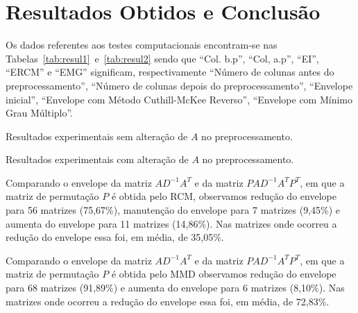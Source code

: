 \section{Resultados Obtidos e Conclusão}
Os dados referentes aos testes computacionais encontram-se nas
Tabelas~\ref{tab:resul1}~e~\ref{tab:resul2} sendo que ``Col. b.p'', ``Col,
a.p'', ``EI'', ``ERCM'' e ``EMG'' significam, respectivamente ``Número de
colunas antes do preprocessamento'', ``Número de colunas depois do preprocessamento'',
``Envelope inicial'', ``Envelope com Método Cuthill-McKee Reverso'', ``Envelope
com Mínimo Grau Múltiplo''.
\begin{table}[h]
    \centering
    \caption{Resultados experimentais sem alteração de $A$ no preprocessamento.}
    \label{tab:resul1}
\end{table}
\begin{sidewaystable}
  \caption{Resultados experimentais com alteração de $A$ no preprocessamento.}
  \label{tab:resul2}
  \hfill\vspace{-11pt}
\end{sidewaystable}

Comparando o envelope da matriz $A D^{-1} A^T$ e da matriz $P A D^{-1} A^T P^T$,
em que a matriz de permutação $P$ é obtida pelo RCM, observamos
redução do envelope para 56 matrizes (75,67\%),
manutenção do envelope para 7 matrizes (9,45\%) e
aumenta do envelope para 11 matrizes (14,86\%).
Nas matrizes onde ocorreu a redução do envelope essa foi, em média, de 35,05\%.

Comparando o envelope da matriz $A D^{-1} A^T$ e da matriz $P A D^{-1} A^T P^T$,
em que a matriz de permutação $P$ é obtida pelo MMD
observamos
redução do envelope para 68 matrizes (91,89\%) e
aumenta do envelope para 6 matrizes (8,10\%).
Nas matrizes onde ocorreu a redução do envelope essa foi, em média, de 72,83\%.
